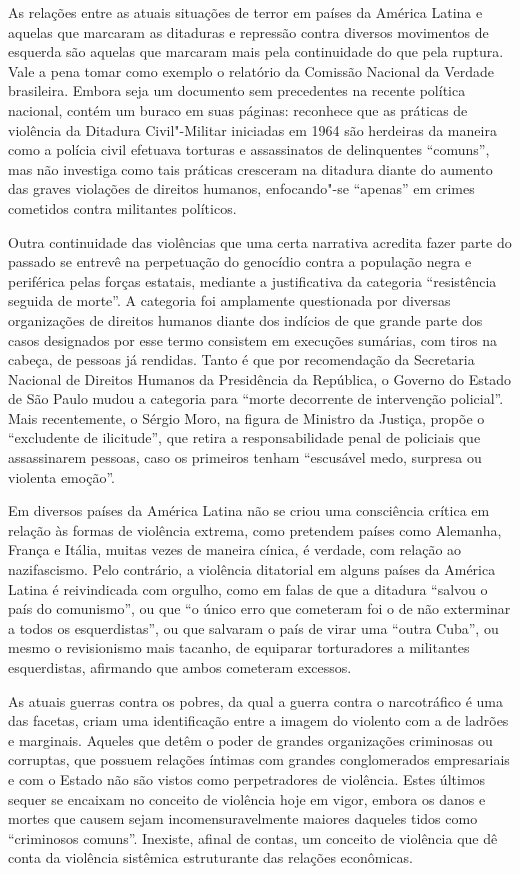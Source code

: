 As relações entre as atuais situações de terror em países da América
Latina e aquelas que marcaram as ditaduras e repressão contra diversos movimentos de
esquerda são aquelas que marcaram mais pela continuidade do que pela ruptura. Vale a
pena tomar como exemplo o relatório da Comissão Nacional da Verdade
brasileira. Embora seja um documento sem precedentes na recente política
nacional, contém um buraco em suas páginas: reconhece que as práticas de
violência da Ditadura Civil"-Militar iniciadas em 1964 são herdeiras da
maneira como a polícia civil efetuava torturas e assassinatos de
delinquentes ``comuns'', mas não investiga como tais práticas cresceram
na ditadura diante do aumento das graves violações de direitos humanos,
enfocando"-se ``apenas'' em crimes cometidos contra militantes políticos.

Outra continuidade das violências que uma certa narrativa acredita fazer
parte do passado se entrevê na perpetuação do genocídio contra a
população negra e periférica pelas forças estatais, mediante a
justificativa da categoria ``resistência seguida de morte''. A categoria
foi amplamente questionada por diversas organizações de direitos humanos
diante dos indícios de que grande parte dos casos designados por esse
termo consistem em execuções sumárias, com tiros na cabeça, de pessoas
já rendidas. Tanto é que por recomendação da Secretaria Nacional de
Direitos Humanos da Presidência da República, o Governo do Estado de São
Paulo mudou a categoria para ``morte decorrente de intervenção
policial''. Mais recentemente, o Sérgio Moro, na figura de Ministro da Justiça, propõe o ``excludente de ilicitude'', que retira a responsabilidade penal de policiais que assassinarem pessoas, caso os primeiros tenham ``escusável medo, surpresa ou violenta emoção''.

Em diversos países da América Latina não se criou uma consciência
crítica em relação às formas de violência extrema, como pretendem países
como Alemanha, França e Itália, muitas vezes de maneira cínica, é
verdade, com relação ao nazifascismo. Pelo contrário, a violência
ditatorial em alguns países da América Latina é reivindicada com
orgulho, como em falas de que a ditadura ``salvou o país do comunismo'',
ou que ``o único erro que cometeram foi o de não exterminar a todos os
esquerdistas'', ou que salvaram o país de virar uma ``outra Cuba'', ou
mesmo o revisionismo mais tacanho, de equiparar torturadores a
militantes esquerdistas, afirmando que ambos cometeram excessos.

As atuais guerras contra os pobres, da qual a guerra contra o
narcotráfico é uma das facetas, criam uma identificação entre a imagem do violento com a
de ladrões e marginais. Aqueles que detêm o poder de grandes
organizações criminosas ou corruptas, que possuem relações íntimas com
grandes conglomerados empresariais e com o Estado não são vistos como perpetradores de violência. Estes últimos sequer se
encaixam no conceito de violência hoje em vigor, embora os danos e
mortes que causem sejam incomensuravelmente maiores daqueles tidos como
``criminosos comuns''. Inexiste, afinal de contas, um conceito de
violência que dê conta da violência sistêmica estruturante das
relações econômicas.

